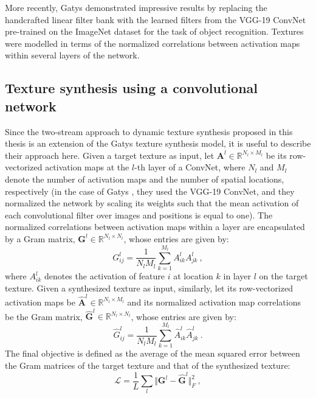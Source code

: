 More recently, Gatys \etal \cite{gatys2015} demonstrated
impressive results by replacing the handcrafted linear filter bank with the learned filters from the VGG-19
\cite{simonyan2014very} ConvNet pre-trained on the ImageNet \cite{russakovsky2015} dataset for the task of object
recognition.
Textures were modelled in terms of the normalized correlations between activation maps within several layers of the network.

\subsection{Texture synthesis using a convolutional network}
\label{sec:texture_synthesis_using_a_convnet}

Since the two-stream approach to dynamic texture synthesis proposed in this thesis is an extension of the Gatys \etal \cite{gatys2015} texture 
synthesis model, it is useful to describe their approach here. Given a target texture as input,
let $\mathbf{A}^{l} \in \mathbb{R}^{N_l\times M_l}$
be its row-vectorized activation maps at the $l$-th layer of a ConvNet, where $N_l$ and $M_l$ denote the number of
activation maps and the number of spatial locations,
respectively (in the case of Gatys \etal \cite{gatys2015}, they used the VGG-19 ConvNet, and they normalized the network by scaling its weights such that the mean activation of each convolutional filter over images and positions is equal to one).
The normalized correlations between activation maps
within a layer are encapsulated by a Gram matrix,
$\mathbf{G}^l \in \mathbb{R}^{N_l \times N_l}$, whose entries are given by:
\begin{equation}
	G_{ij}^l = \frac{1}{N_l M_l} \sum_{k=1}^{M_l} A_{ik}^l A_{jk}^l\ ,
\end{equation}
where $A_{ik}^l$ denotes the activation of feature $i$ at
location $k$ in layer $l$ on the target texture.
Given a synthesized texture as input, similarly, let its row-vectorized activation maps
be $\hat{\mathbf{A}}^{l} \in \mathbb{R}^{N_l\times M_l}$ and its normalized
activation map correlations be the Gram matrix, $\hat{\mathbf{G}}^l \in \mathbb{R}^{N_l \times N_l}$, whose entries are given by:
\begin{equation}
	\hat{G}_{ij}^l = \frac{1}{N_l M_l} \sum_{k=1}^{M_l} \hat{A}_{ik}^l \hat{A}_{jk}^l\ .
\end{equation}
The final objective is defined as the average of the mean squared error between
the Gram matrices of the target texture and that of the synthesized texture:
\begin{equation}
   \mathcal{L} = \frac{1}{L} \sum_{l} \Vert \mathbf{G}^l - \hat{\mathbf{G}}^l \Vert^2_F\ ,
   \label{eq:tex_loss}
\end{equation}
